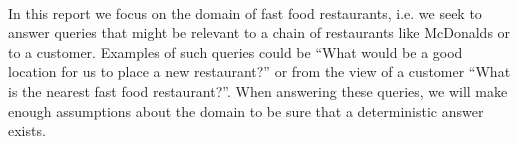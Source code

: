 \paragraph{}
In this report we focus on the domain of fast food restaurants, i.e. we seek to answer queries that might be relevant to a chain of restaurants like McDonalds or to a customer. Examples of such queries could be “What would be a good location for us to place a new restaurant?” or from the view of a customer “What is the nearest fast food restaurant?”. When answering these queries, we will make enough assumptions about the domain to be sure that a deterministic answer exists.